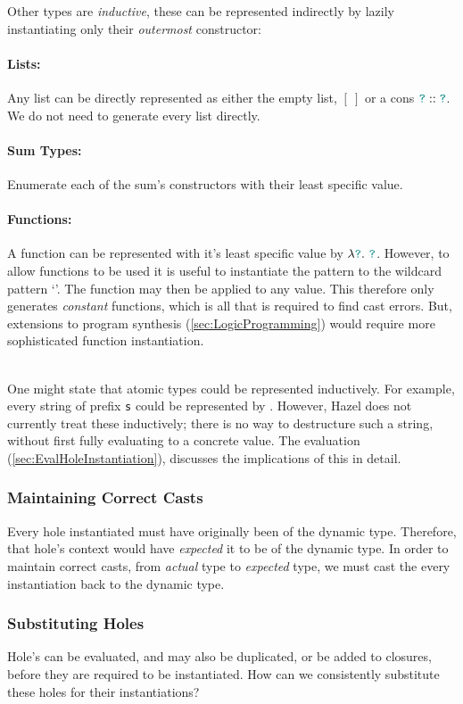 Other types are \textit{inductive}, these can be represented indirectly by lazily instantiating only their \textit{outermost} constructor: 
 
\paragraph{Lists:} Any list can be directly represented as either the empty list, $[\ ]$ or a cons ${\color{teal}\texttt{?}} :: {\color{teal}\texttt{?}}$. We do not need to generate every list directly.
\paragraph{Sum Types:} Enumerate each of the sum's constructors with their least specific value.
\paragraph{Functions:} A function can be represented with it's least specific value by $\lambda {\color{teal}\texttt{?}}.\ {\color{teal}\texttt{?}}$. However, to allow functions to be used it is useful to instantiate the pattern to the wildcard pattern `\code{_}'. The function may then be applied to any value. This therefore only generates \textit{constant} functions, which is all that is required to find cast errors. But, extensions to program synthesis (\cref{sec:LogicProgramming}) would require more sophisticated function instantiation.

\ \\

One might state that atomic types could be represented inductively. For example, every string of prefix \texttt{s} could be represented by . However, Hazel does not currently treat these inductively; there is no way to destructure such a string, without first fully evaluating to a concrete value. The evaluation (\cref{sec:EvalHoleInstantiation}), discusses the implications of this in detail.


\subsubsection{Maintaining Correct Casts}
Every hole instantiated must have originally been of the dynamic type. Therefore, that hole's context would have \textit{expected} it to be of the dynamic type. In order to maintain correct casts, from \textit{actual} type to \textit{expected} type, we must cast the every instantiation back to the dynamic type.

\subsubsection{Substituting Holes}\label{sec:HoleSubstitutionImplementation}
Hole's can be evaluated, and may also be duplicated, or be added to closures, before they are required to be instantiated. How can we consistently substitute these holes for their instantiations?

